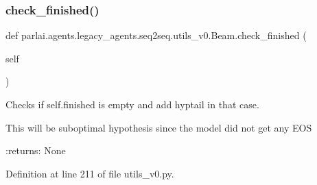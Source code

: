 \mbox{\label{classparlai_1_1agents_1_1legacy__agents_1_1seq2seq_1_1utils__v0_1_1Beam_abea53933203e2126e38657efe715b8b5}} 
\subsubsection{\texorpdfstring{check\+\_\+finished()}{check\_finished()}}
{\footnotesize\ttfamily def parlai.\+agents.\+legacy\+\_\+agents.\+seq2seq.\+utils\+\_\+v0.\+Beam.\+check\+\_\+finished (\begin{DoxyParamCaption}\item[{}]{self }\end{DoxyParamCaption})}

\begin{DoxyVerb}Checks if self.finished is empty and add hyptail in that case.

This will be suboptimal hypothesis since the model did not get any EOS

:returns: None
\end{DoxyVerb}
 

Definition at line 211 of file utils\+\_\+v0.\+py.


